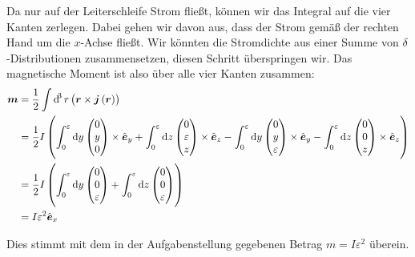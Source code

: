 \documentclass[11pt, ngerman, fleqn]{article}
\newcommand{\ev}{\hat{\vec e}}
\newcommand{\half}{\frac 12}
\renewcommand{\vec}[1]{\boldsymbol{#1}}
\begin{document}
Da nur auf der Leiterschleife Strom fließt, können wir das Integral auf die
vier Kanten zerlegen. Dabei gehen wir davon aus, dass der Strom gemäß der
rechten Hand um die $x$-Achse fließt. Wir könnten die Stromdichte aus einer
Summe von $\delta$-Distributionen zusammensetzen, diesen Schritt überspringen
wir. Das magnetische Moment ist also über alle vier Kanten zusammen:
\begin{align*}
	\vec m
	&= \half \int \dif^3 r \del{\vec r \times \vec j\del{\vec r}} \\
	&= \half I \del{
	\int_0^\varepsilon \dif y
	\begin{pmatrix}
		0 \\ y \\ 0
	\end{pmatrix}
	\times
	\ev_y
	+
	\int_0^\varepsilon \dif z
	\begin{pmatrix}
		0 \\ \varepsilon \\ z
	\end{pmatrix}
	\times
	\ev_z
	-
	\int_0^\varepsilon \dif y
	\begin{pmatrix}
		0 \\ y \\ \varepsilon
	\end{pmatrix}
	\times
	\ev_y
	-
	\int_0^\varepsilon \dif z
	\begin{pmatrix}
		0 \\ 0 \\ z
	\end{pmatrix}
	\times
	\ev_z
} \\
	&= \half I \del{
	\int_0^\varepsilon \dif y
	\begin{pmatrix}
		0 \\ 0 \\ \varepsilon
	\end{pmatrix}
	+
	\int_0^\varepsilon \dif z
	\begin{pmatrix}
		0 \\ 0 \\ \varepsilon
	\end{pmatrix}
} \\
&= I \varepsilon^2 \ev_x
\end{align*}

Dies stimmt mit dem in der Aufgabenstellung gegebenen Betrag $m = I \varepsilon^2$
überein.
\end{document}

